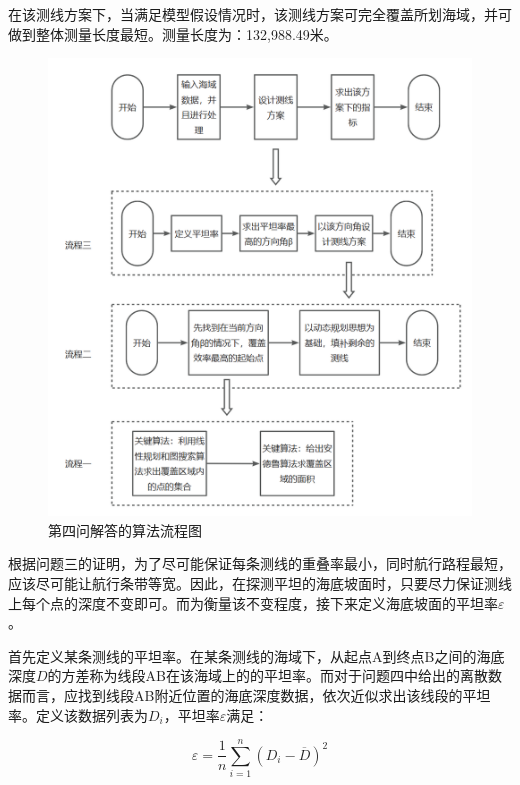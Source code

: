 在该测线方案下，当满足模型假设情况时，该测线方案可完全覆盖所划海域，并可做到整体测量长度最短。测量长度为：132,988.49米。


\begin{figure}[h]
    \centering
    \includegraphics[scale=0.3]{res/img/第四问解答的算法流程图.png}
    \caption[short]{第四问解答的算法流程图}
\end{figure}


根据问题三的证明，为了尽可能保证每条测线的重叠率最小，同时航行路程最短，应该尽可能让航行条带等宽。因此，在探测平坦的海底坡面时，只要尽力保证测线上每个点的深度不变即可。而为衡量该不变程度，接下来定义海底坡面的平坦率$\varepsilon$。

首先定义某条测线的平坦率。在某条测线的海域下，从起点A到终点B之间的海底深度$D$的方差称为线段AB在该海域上的的平坦率。而对于问题四中给出的离散数据而言，应找到线段AB附近位置的海底深度数据，依次近似求出该线段的平坦率。定义该数据列表为$D_{i}$，平坦率$\varepsilon$满足：

\begin{equation}
    \varepsilon = \frac{1}{n} \sum^{n}_{i=1}(D_i - \overline{D} )^2
\end{equation}

